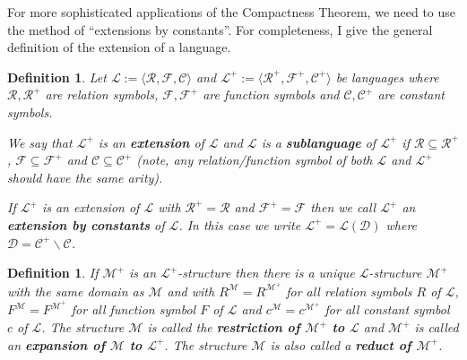 \documentclass[11pt]{article}
\newtheorem{exercise}[theorem]{Exercise}
\newtheorem{definition}[theorem]{Definition}
\newcommand{\mcal}[1]{\mathcal{#1}}
\newcommand{\C}{\mathbb{C}}
\newcommand{\N}{\mathbb{N}}
\begin{document}

For more sophisticated applications of the Compactness Theorem, we need to use the method of ``extensions by constants''. For completeness, I give the general definition of the extension of a language.


\begin{definition}
Let $\mcal{L}:=\langle\mcal{R},\mcal{F},\mcal{C}\rangle$ and $\mcal{L}^+:=\langle \mcal{R}^+,\mcal{F}^+,\mcal{C}^+\rangle$ be languages where $\mcal{R},  \mcal{R}^+$ are relation symbols, $\mcal{F},\mcal{F}^+$ are function symbols and $\mcal{C}, \mcal{C}^+$ are constant symbols.

We say that $\mcal{L}^+$ is an \textbf{extension} of $\mcal{L}$ and $\mcal{L}$ is a \textbf{sublanguage} of $\mcal{L}^+$ if $\mcal{R}\subseteq \mcal{R}^+$, $\mcal{F}\subseteq \mcal{F}^+$ and $\mcal{C}\subseteq \mcal{C}^+$ (note, any relation/function symbol of both $\mcal{L}$ and $\mcal{L}^+$ should have the same arity).

If $\mcal{L}^+$ is an extension of $\mcal{L}$ with $\mcal{R}^+=\mcal{R}$ and $\mcal{F}^+=\mcal{F}$ then we call $\mcal{L}^+$ an \textbf{extension by constants} of $\mcal{L}$. In this case we write $\mcal{L}^+=\mcal{L}(\mcal{D})$ where $\mcal{D}=\mcal{C}^+\backslash \mcal{C}$.
\end{definition}

\begin{definition}
If $\mcal{M} ^+$ is an $\mcal{L} ^+$-structure then there is a unique $\mcal{L}$-structure
$\mcal{M}^+ $ with the same domain as $\mcal{M}$ and with  $R^\mcal{M} =R^{\mcal{M} ^+}$ for all relation symbols $R$ of $\mcal{L}$,
$F^\mcal{M} =F^{\mcal{M} ^+}$ for all function symbol $F$ of $\mcal{L}$ and
$c^\mcal{M} =c^{\mcal{M} ^+}$ for all constant symbol $c$ of $\mcal{L}$. The structure $\mcal{M} $ is called the
\textbf{restriction of $\mcal{M}^+$ to $\mcal{L}$}
and $\mcal{M} ^+$ is called an \textbf{expansion of $\mcal{M} $ to $\mcal{L} ^+$}.
The structure $\mcal{M} $ is also called a
\textbf{reduct of $\mcal{M}^+$}.
\end{definition}
\end{document}
